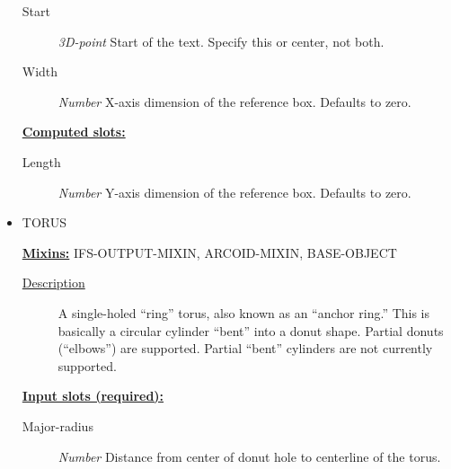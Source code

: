 \documentclass [11pt]{book}
\begin{document}
\begin{itemize}
\begin{description}
\item [Start]
\emph{3D-point} Start of the text. Specify this or center, not both.


\item [Width]
\emph{Number} X-axis dimension of the reference box. Defaults to zero.


\end{description}






\textbf{
\underline{Computed slots:}}

\begin{description}

\item [Length]
\emph{Number} Y-axis dimension of the reference box. Defaults to zero.


\end{description}







\item {}TORUS


\textbf{
\underline{Mixins:}} IFS-OUTPUT-MIXIN, ARCOID-MIXIN, BASE-OBJECT





\begin{description}

\item [
\underline{Description}]


A single-holed ``ring'' torus, also known as an ``anchor ring.''
This is basically a circular cylinder ``bent'' into a donut shape. Partial donuts (``elbows'') are supported.
Partial ``bent'' cylinders are not currently supported.



\end{description}








\textbf{
\underline{Input slots (required):}}

\begin{description}

\item [Major-radius]
\emph{Number} Distance from center of donut hole to centerline of the torus.



\end{description}
\end{itemize}
\end{document}
